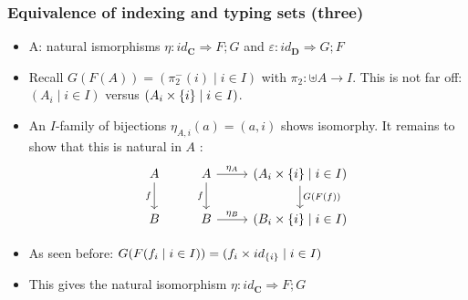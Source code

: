 \documentclass[handout]{beamer}
\newcommand{\To}{\Rightarrow}
\newcommand{\bfsf}[1]{{\boldsymbol{#1}}}
\newcommand{\CC}{\bfsf{C}}
\newcommand{\DD}{\bfsf{D}}
\begin{document}
\frame
  {   
    \frametitle{Equivalence of indexing and typing sets (three)}\label{Ch3:Eq-ind-typ-Set-eta}

 \begin{itemize}[<+->]
\item A: natural ismorphisms $\eta: id_\CC \To F;G$ and $\varepsilon :  id_\DD \To G;F$
\item Recall $G(F(A)) = (\pi_2^-(i) \mid i\in I)$ with $\pi_2: \uplus A \to I$.
This is not far off: $(A_i\mid  i\in I)$ versus $(A_i\times \{i\}\mid  i\in I)$.
\item An $I$-family of bijections $\eta_{A,i}(a)= (a,i)$ shows isomorphy.
It remains to show that this is natural in $A$ :
\[
\begin{tikzcd}[ampersand replacement=\&]
A \arrow[swap]{d}{f} \& A  \arrow[swap]{d}{f}\arrow{r}{\eta_A} 
\&\arrow{d}{G(F(f))} (A_i\times \set{i}\mid  i\in I)\\
B \& B  \arrow{r}{\eta_B} \& (B_i\times \set{i}\mid  i\in I)
\end{tikzcd}
\]
\item As seen before: $G(F(f_i \mid i\in I)) = (f_i \times id_{\{i\}} \mid i\in I)$
\item This gives the natural isomorphism $\eta: id_\CC \To F;G$
 \end{itemize}

 }
\end{document}
